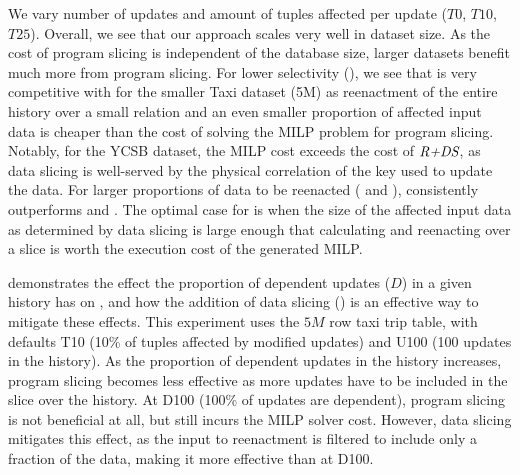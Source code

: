 %


We vary number of updates and amount of tuples affected per update ($T0$, $T10$, $T25$). Overall, we see that our approach scales very well in dataset size. As the cost of program slicing is independent of the database size, larger datasets benefit much more from program slicing. %
For lower selectivity (), we see that \mrd is very competitive with \mrdp for the smaller Taxi dataset (5M) as reenactment of the entire history over a small relation and an even smaller proportion of affected input data is cheaper than the cost of solving the MILP problem for program slicing. Notably, for the YCSB dataset, the MILP cost exceeds the cost of $\textit{R+DS}$, as data slicing is well-served by the physical correlation of the key used to update the data. For larger proportions of data to be reenacted ( and ),  \mrdp  consistently outperforms \mrp and \mrd. The optimal case for \mrdp is when the size of the  affected input data as determined by data slicing is large enough that calculating and reenacting over a slice is worth the execution cost of the generated MILP.


%
%
%

%

%
\label{sec:exp-dep}
%
 demonstrates the effect the proportion of dependent updates ($D$) in a given history has on \mrp, and how the addition of data slicing (\mrdp) is an effective way to mitigate these effects. This experiment uses the $5M$ row taxi trip table, with defaults T10 (10\% of tuples affected by modified updates) and U100 (100 updates in the history). As the proportion of dependent updates in the history increases, program slicing becomes less effective as more updates have to be included in the slice over the history. At D100 (100\% of updates are dependent), program slicing is not beneficial at all, but still incurs the MILP solver cost. However, data slicing  mitigates this effect, as the input to reenactment is filtered to include only a fraction of the data, making it more effective than \mrp at D100.

